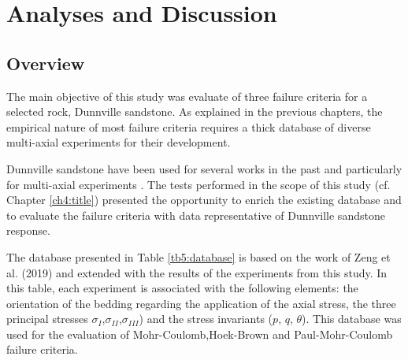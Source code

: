 \chapter{Analyses and Discussion}\label{ch5:chapter5}


\section{Overview}\label{ch5:database}

The main objective of this study was evaluate of three failure criteria for a selected rock, Dunnville sandstone. As explained in the previous chapters, the empirical nature of most failure criteria requires a thick database of diverse multi-axial experiments for their development. 

Dunnville sandstone have been used for several works in the past and particularly for multi-axial experiments \cite{Labuz2018}\cite{Zeng2019}\cite{Tarokh2016}. The tests performed in the scope of this study (cf. Chapter \ref{ch4:title}) presented the opportunity to enrich the existing database and to evaluate the failure criteria with data representative of Dunnville sandstone response.

The database presented in Table \ref{tb5:database} is based on the work of Zeng et al. (2019) \cite{Zeng2019} and extended with the results of the experiments from this study. In this table, each experiment is associated with the following elements: the orientation of the bedding regarding the application of the axial stress, the three principal stresses  $\sigma_I$,$\sigma_{II}$,$\sigma_{III}$) and the stress invariants ($p$, $q$, $\theta$). This database was used for the evaluation of Mohr-Coulomb,Hoek-Brown and Paul-Mohr-Coulomb failure criteria.

